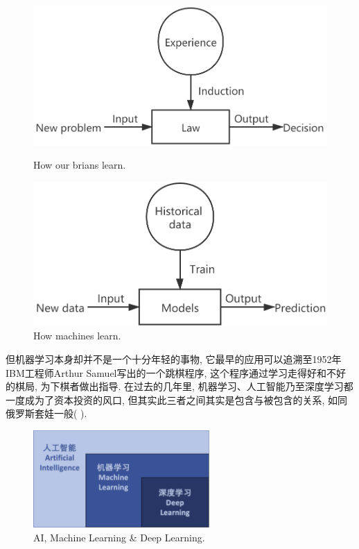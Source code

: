 \documentclass[lang=cn,11pt,a4paper]{elegantpaper}
\begin{document}
\begin{figure}[htbp]
	\centering
	\begin{minipage}[t]{0.45\textwidth}
	\centering
	\includegraphics[width=1\textwidth]{Brian}
	\caption{How our brians learn.\label{fig:Brian}}
	\end{minipage}
	\begin{minipage}[t]{0.45\textwidth}
	\centering
	\includegraphics[width=1\textwidth]{Machine}
	\caption{How machines learn.\label{fig:Machine}}
	\end{minipage}
\end{figure}
\par 但机器学习本身却并不是一个十分年轻的事物, 它最早的应用可以追溯至1952年IBM工程师Arthur Samuel写出的一个跳棋程序, 这个程序通过学习走得好和不好的棋局, 为下棋者做出指导\cite{AS1}\cite{AS2}. 在过去的几年里, 机器学习、人工智能乃至深度学习都一度成为了资本投资的风口, 但其实此三者之间其实是包含与被包含的关系, 如同俄罗斯套娃一般( ).
\begin{figure}[htbp]
	\centering
	\includegraphics[width=0.6\textwidth]{AI}
  	\caption{AI, Machine Learning \& Deep Learning.\label{fig:AI}}
\end{figure}
\end{document}
